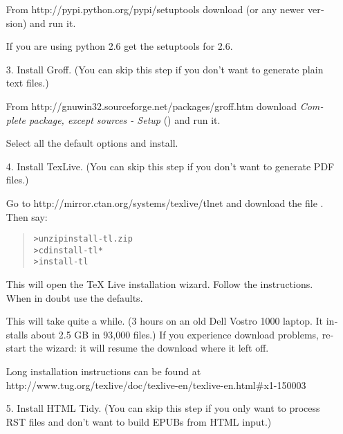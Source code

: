 \documentclass[a5paper]{book}
\begin{document}
\begin{german}
\begin{itemize}
From {http://pypi.python.org/pypi/setuptools} download
{} (or any newer version)
and run it.\par

If you are using python 2.6 get the setuptools for 2.6.\par

\item[3.] 
Install Groff. (You can skip this step if you don’t want to
generate plain text files.)\par

From {http://gnuwin32.sourceforge.net/packages/groff.htm}
download {\itshape{Complete package, except sources - Setup}}
({}) and run it.\par

Select all the default options and install.\par

\item[4.] 
Install TexLive. (You can skip this step if you don’t want to
generate PDF files.)\par

Go to {http://mirror.ctan.org/systems/texlive/tlnet} and download the
file {}. Then say:\par

\begin{quote}
\begin{alltt}
> unzip install-tl.zip
> cd install-tl*
> install-tl
\end{alltt}
\end{quote}

This will open the TeX Live installation wizard. Follow the
instructions. When in doubt use the defaults.\par

This will take quite a while. (3 hours on an old Dell Vostro 1000
laptop. It installs about 2.5 GB in 93,000 files.) If you
experience download problems, restart the wizard: it will resume
the download where it left off.\par

Long installation instructions can be found at
{http://www.tug.org/texlive/doc/texlive-en/texlive-en.html\#x1-150003}\par

\item[5.] 
Install HTML Tidy. (You can skip this step if you only want to
process RST files and don’t want to build EPUBs from HTML input.)\par


\end{itemize}
\end{german}
\end{document}
